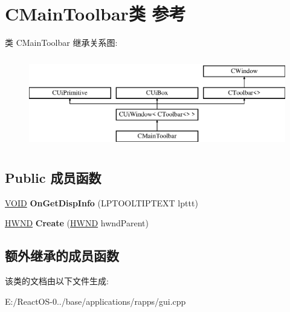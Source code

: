 \hypertarget{class_c_main_toolbar}{}\section{C\+Main\+Toolbar类 参考}
\label{class_c_main_toolbar}
类 C\+Main\+Toolbar 继承关系图\+:\begin{figure}[H]
\begin{center}
\leavevmode
\includegraphics[height=4.000000cm]{class_c_main_toolbar}
\end{center}
\end{figure}
\subsection*{Public 成员函数}
\begin{DoxyCompactItemize}
\item 
\mbox{\label{class_c_main_toolbar_a829385a02bfc44aaff7dd178a644b190}} 
\hyperlink{interfacevoid}{V\+O\+ID} {\bfseries On\+Get\+Disp\+Info} (L\+P\+T\+O\+O\+L\+T\+I\+P\+T\+E\+XT lpttt)
\item 
\mbox{\label{class_c_main_toolbar_a8d6d1209646ec2ff14616502e22cb0cf}} 
\hyperlink{interfacevoid}{H\+W\+ND} {\bfseries Create} (\hyperlink{interfacevoid}{H\+W\+ND} hwnd\+Parent)
\end{DoxyCompactItemize}
\subsection*{额外继承的成员函数}


该类的文档由以下文件生成\+:\begin{DoxyCompactItemize}
\item 
E\+:/\+React\+O\+S-\/0../base/applications/rapps/gui.\+cpp\end{DoxyCompactItemize}
